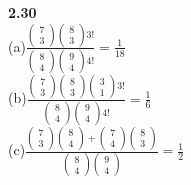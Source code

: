 \documentclass{book}%
\begin{document}
	{\bfseries 2.30}\\
	(a)$\frac{\begin{pmatrix}
			7\\3
		\end{pmatrix}\begin{pmatrix}
			8\\3
		\end{pmatrix}3!}{\begin{pmatrix}
			8\\4
		\end{pmatrix}\begin{pmatrix}
			9\\4
		\end{pmatrix}4!}=\frac{1}{18}$\\
	(b)$\frac{\begin{pmatrix}
			7\\3
		\end{pmatrix}\begin{pmatrix}
			8\\3
		\end{pmatrix}\begin{pmatrix}
			3\\1
		\end{pmatrix}3!}{\begin{pmatrix}
			8\\4
		\end{pmatrix}\begin{pmatrix}
			9\\4
		\end{pmatrix}4!}=\frac{1}{6}$\\
	(c)$\frac{\begin{pmatrix}
			7\\3
		\end{pmatrix}\begin{pmatrix}
			8\\4
		\end{pmatrix}+\begin{pmatrix}
			7\\4
		\end{pmatrix}\begin{pmatrix}
			8\\3
	\end{pmatrix}}{\begin{pmatrix}
			8\\4
		\end{pmatrix}\begin{pmatrix}
			9\\4
	\end{pmatrix}}=\frac{1}{2}$\\
	~\\
	
\end{document}
